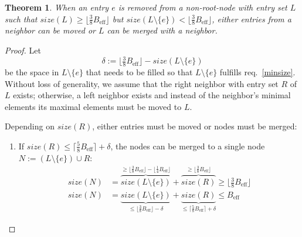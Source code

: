 \documentclass{vldb}
\newtheorem{thm}{Theorem}
\newcommand \Beff { B_{\text{eff}} }
\begin{document}
\begin{thm}
When an entry $e$ is removed from a non-root-node with entry set $L$ such that 
$size(L) \geq \lfloor \tfrac{3}{8} \Beff \rfloor$ but
$size(L \setminus \{e\}) < \lfloor \tfrac{3}{8} \Beff \rfloor$, either entries
from a neighbor can be moved or $L$ can be merged with a neighbor.
\end{thm}

\begin{proof}
Let \[\delta := \lfloor \tfrac{3}{8} \Beff \rfloor - size(L \setminus \{e\})\]
be the space in \mbox{$L \setminus \{e\}$} that needs to be filled so that
\mbox{$L \setminus \{e\}$} fulfills req.~\ref{minsize}.
Without loss of generality, we assume that the right neighbor with entry set $R$
of $L$ exists; otherwise, a left neighbor exists and instead of the neighbor's
minimal elements its maximal elements must be moved to $L$.

Depending on $size(R)$, either entries must be moved or nodes must be merged:
\begin{enumerate}
\item If \mbox{$size(R) \leq \lceil \frac{5}{8} \Beff \rceil + \delta$},
the nodes can be merged to a single node
\mbox{$N := (L \setminus \{e\}) \cup R$}:
\begin{align*}
size(N)
    &= \overbrace{size(L \setminus \{e\})}^{
            \geq \lfloor \frac{3}{8} \Beff \rfloor 
                - \lfloor \frac{1}{4} \Beff \rfloor}
        + \overbrace{size(R)}^{
            \geq \lfloor \frac{3}{8} \Beff \rfloor}
    \geq \lfloor \tfrac{3}{8} \Beff \rfloor\\
size(N)
    &= \underbrace{size(L \setminus \{e\})}_{
            \leq \lfloor \frac{3}{8} \Beff \rfloor - \delta}
        + \underbrace{size(R)}_{
            \leq \lceil \frac{5}{8} \Beff \rceil + \delta}
    \leq \Beff
\end{align*}


\end{enumerate}
\end{proof}
\end{document}
